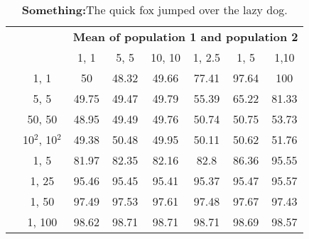 \documentclass[12pt,phd ,a4paper,oneside]{ucl_thesis}
\begin{document}
\begin{table}[ht]
	\centering
	\begin{tabular}{|c|c||c|c|c||c|c|c|}\hline
		\multicolumn{2}{|c|}{} & \multicolumn{6}{c|}{\textbf{Mean of population 1 and population 2}} \\ \cline{3-8}
		\multicolumn{2}{|c|}{} & 1, 1 & 5, 5 &\multicolumn{1}{c|}{10, 10} & 1, 2.5 & 1, 5 & 1,10 \\\hhline{========} \cline{1-8}
		\multirow{8}{*}{\textbf{SD}} & 1, 1 & \cellcolor{lightyellow}50 & \cellcolor{lightyellow}48.32 & \cellcolor{lightyellow}49.66 & 
		\cellcolor{red}77.41 & 
		\cellcolor{red}97.64 & 
		\cellcolor{red}100 \\ \cline{2-8}
		& 5, 5 & 
		\cellcolor{lightyellow}49.75 & \cellcolor{lightyellow}49.47 & 
		\cellcolor{lightyellow}49.79 &
		\cellcolor{red}55.39 &
		\cellcolor{red}65.22 & 
		\cellcolor{red}81.33 \\ \cline{2-8}
		& 50, 50 & 
		\cellcolor{lightyellow}48.95 & 
		\cellcolor{lightyellow}49.49 & 
		\cellcolor{lightyellow}49.76 & 
		\cellcolor{red}50.74 & 
		\cellcolor{red}50.75 & 
		\cellcolor{red}53.73 \\ \cline{2-8}
		& 10$^{2} $, 10$^{2} $ & 
		\cellcolor{lightyellow}49.38 & 
		\cellcolor{lightyellow}50.48 & 
		\cellcolor{lightyellow}49.95 & 
		\cellcolor{red}50.11 & 
		\cellcolor{red}50.62 & 
		\cellcolor{red}51.76 \\\hhline{~=======} %
		& 1, 5 & \cellcolor{lightgreen}81.97 & \cellcolor{lightgreen}82.35 & \cellcolor{lightgreen}82.16 & \cellcolor{intnull}82.8 &\cellcolor{intnull} \cellcolor{intnull}86.36 & \cellcolor{intnull}95.55 \\ \cline{2-8}
		& 1, 25 & \cellcolor{lightgreen}95.46 & \cellcolor{lightgreen}95.45 & \cellcolor{lightgreen}95.41 &\cellcolor{intnull} 95.37 & \cellcolor{intnull}95.47 & \cellcolor{intnull}95.57 \\ \cline{2-8}
		& 1, 50 & \cellcolor{lightgreen}97.49 & \cellcolor{lightgreen}97.53 & \cellcolor{lightgreen}97.61 &\cellcolor{intnull} 97.48 & \cellcolor{intnull}97.67 & \cellcolor{intnull}97.43 \\ \cline{2-8}
		& 1, 100 & \cellcolor{lightgreen}98.62 & \cellcolor{lightgreen}98.71 & \cellcolor{lightgreen}98.71 &\cellcolor{intnull} 98.71 & \cellcolor{intnull}98.69 & \cellcolor{intnull} 98.57 \\ \cline{2-8}
		\hline 
	\end{tabular} 
	\caption[Something]{\textbf{Something:}The quick fox jumped over the lazy dog. }
	\label{table19}
\end{table}
\end{document}
